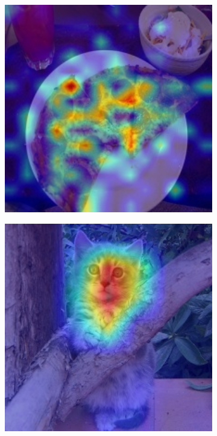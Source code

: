 \begin{figure}[t]
\begin{subfigure}[b]{0.19\textwidth}
        \includegraphics[width=1\textwidth]{figures/qualitative_results/ILSVRC2012_val_00018461_resmlp_24_224.JPEG}
    \end{subfigure}  
    \begin{subfigure}[b]{0.19\textwidth}
        \centering
        \includegraphics[width=1\textwidth]{figures/qualitative_results/ILSVRC2012_val_00023779_poolformer_s24.JPEG}

\end{subfigure}
\end{figure}
